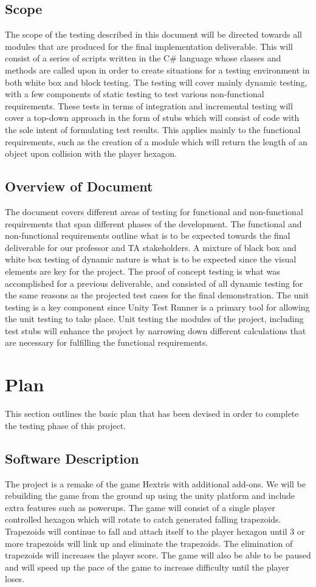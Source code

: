 \documentclass[12pt, titlepage]{article}
\begin{document}
\subsection{Scope}
The scope of the testing described in this document will be directed towards all modules that are produced for the final implementation deliverable. This will consist of a series of scripts written in the C\# language whose classes and methods are called upon in order to create situations for a testing environment in both white box and block testing.  The testing will cover mainly dynamic testing, with a few components of static testing to test various non-functional requirements. These tests in terms of integration and incremental testing will cover a top-down approach in the form of stubs which will consist of code with the sole intent of formulating test results. This applies mainly to the functional requirements, such as the creation of a module which will return the length of an object upon collision with the player hexagon. 

\subsection{Overview of Document}
The document covers different areas of testing for functional and non-functional requirements that span different phases of the development. The functional and non-functional requirements outline what is to be expected towards the final deliverable for our professor and TA stakeholders. A mixture of black box and white box testing of dynamic nature is what is to be expected since the visual elements are key for the project. The proof of concept testing is what was accomplished for a previous deliverable, and consisted of all dynamic testing for the same reasons as the projected test cases for the final demonstration. The unit testing is a key component since Unity Test Runner is a primary tool for allowing the unit testing to take place. Unit testing the modules of the project, including test stubs will enhance the project by narrowing down different calculations that are necessary for fulfilling the functional requirements. 


\section{Plan}
\noindent This section outlines the basic plan that has been devised in order to complete the testing phase of this project.
\subsection{Software Description}
The project is a remake of the game Hextris with additional add-ons. We will be rebuilding the game from the ground up using the unity platform and include extra features such as powerups. The game will consist of a single player controlled hexagon which will rotate to catch generated falling trapezoids. Trapezoids will continue to fall and attach itself to the player hexagon until 3 or more trapezoids will link up and eliminate the trapezoids. The elimination of trapezoids will increases the player score. The game will also be able to be paused and will speed up the pace of the game to increase difficulty until the player loses.
\end{document}
